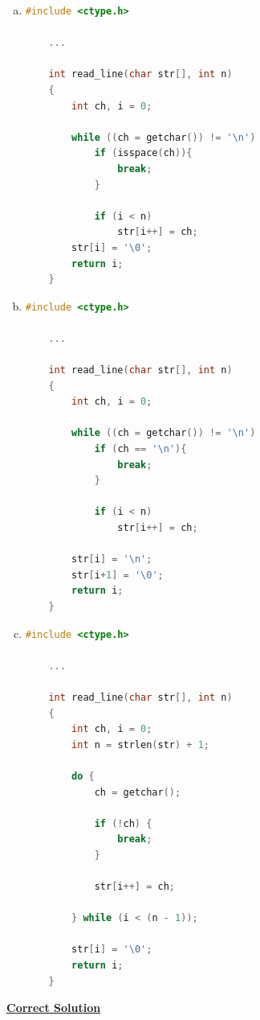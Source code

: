 \documentclass[12pt]{article}
\begin{document}
\begin{enumerate}[1.]
\begin{enumerate}[a)]
        \item

\begin{lstlisting}[language=c]
    #include <ctype.h>

    ...

    int read_line(char str[], int n)
    {
        int ch, i = 0;

        while ((ch = getchar()) != '\n')
            if (isspace(ch)){
                break;
            }

            if (i < n)
                str[i++] = ch;
        str[i] = '\0';
        return i;
    }
\end{lstlisting}

        \item

\begin{lstlisting}[language=c]
    #include <ctype.h>

    ...

    int read_line(char str[], int n)
    {
        int ch, i = 0;

        while ((ch = getchar()) != '\n')
            if (ch == '\n'){
                break;
            }

            if (i < n)
                str[i++] = ch;

        str[i] = '\n';
        str[i+1] = '\0';
        return i;
    }
\end{lstlisting}

        \item

\begin{lstlisting}[language=c]
    #include <ctype.h>

    ...

    int read_line(char str[], int n)
    {
        int ch, i = 0;
        int n = strlen(str) + 1;

        do {
            ch = getchar();

            if (!ch) {
                break;
            }

            str[i++] = ch;

        } while (i < (n - 1));

        str[i] = '\0';
        return i;
    }
\end{lstlisting}


    \end{enumerate}

    \bigskip

    \begin{mdframed}
    \underline{\textbf{Correct Solution}}


\end{mdframed}
\end{enumerate}
\end{document}
